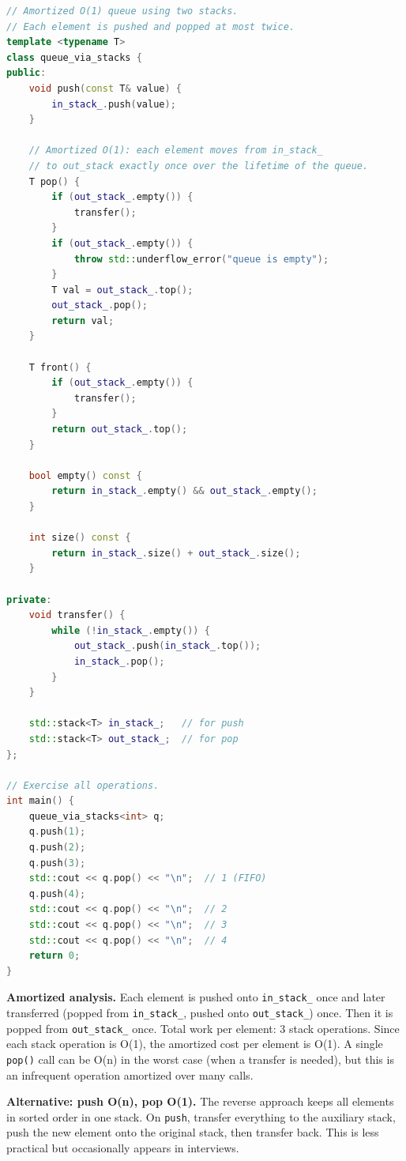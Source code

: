 \begin{lstlisting}[language=C++]
// Amortized O(1) queue using two stacks.
// Each element is pushed and popped at most twice.
template <typename T>
class queue_via_stacks {
public:
    void push(const T& value) {
        in_stack_.push(value);
    }

    // Amortized O(1): each element moves from in_stack_
    // to out_stack exactly once over the lifetime of the queue.
    T pop() {
        if (out_stack_.empty()) {
            transfer();
        }
        if (out_stack_.empty()) {
            throw std::underflow_error("queue is empty");
        }
        T val = out_stack_.top();
        out_stack_.pop();
        return val;
    }

    T front() {
        if (out_stack_.empty()) {
            transfer();
        }
        return out_stack_.top();
    }

    bool empty() const {
        return in_stack_.empty() && out_stack_.empty();
    }

    int size() const {
        return in_stack_.size() + out_stack_.size();
    }

private:
    void transfer() {
        while (!in_stack_.empty()) {
            out_stack_.push(in_stack_.top());
            in_stack_.pop();
        }
    }

    std::stack<T> in_stack_;   // for push
    std::stack<T> out_stack_;  // for pop
};

// Exercise all operations.
int main() {
    queue_via_stacks<int> q;
    q.push(1);
    q.push(2);
    q.push(3);
    std::cout << q.pop() << "\n";  // 1 (FIFO)
    q.push(4);
    std::cout << q.pop() << "\n";  // 2
    std::cout << q.pop() << "\n";  // 3
    std::cout << q.pop() << "\n";  // 4
    return 0;
}
\end{lstlisting}

\textbf{Amortized analysis.} Each element is pushed onto \texttt{in\_stack\_} once and later transferred (popped from \texttt{in\_stack\_}, pushed onto \texttt{out\_stack\_}) once. Then it is popped from \texttt{out\_stack\_} once. Total work per element: 3 stack operations. Since each stack operation is O(1), the amortized cost per element is O(1). A single \texttt{pop()} call can be O(n) in the worst case (when a transfer is needed), but this is an infrequent operation amortized over many calls.

\textbf{Alternative: push O(n), pop O(1).} The reverse approach keeps all elements in sorted order in one stack. On \texttt{push}, transfer everything to the auxiliary stack, push the new element onto the original stack, then transfer back. This is less practical but occasionally appears in interviews.

